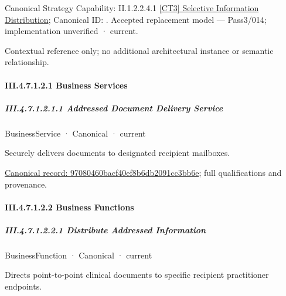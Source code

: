 {\small Canonical Strategy Capability: II.1.2.2.4.1 \hyperref[element:87869a1eec5f4c7cb87600a06cc8fd6e]{[CT3] Selective Information Distribution}; Canonical ID: \texttt{}. Accepted replacement model — Pass3/014; implementation unverified · current.}\par
Contextual reference only; no additional architectural instance or semantic relationship.\par
\paragraph*{III.4.7.1.2.1 Business Services}
\label{navigation:III.4.7.1.2.1}

\subparagraph*{III.4.7.1.2.1.1 Addressed Document Delivery Service}
\label{navigation:III.4.7.1.2.1.1}

\label{element:97080460bacf40ef8b6db2091cc3bb6e}
{\small BusinessService · Canonical · current}\par

Securely delivers documents to designated recipient mailboxes.


{\footnotesize \href{../../../../continuum/business/business-service/97080460bacf40ef8b6db2091cc3bb6e.md}{Canonical record: 97080460bacf40ef8b6db2091cc3bb6e}; full qualifications and provenance.}\par
\paragraph*{III.4.7.1.2.2 Business Functions}
\label{navigation:III.4.7.1.2.2}

\subparagraph*{III.4.7.1.2.2.1 Distribute Addressed Information}
\label{navigation:III.4.7.1.2.2.1}

\label{element:6c9090a3d0a74a968475e05eb617e84f}
{\small BusinessFunction · Canonical · current}\par

Directs point-to-point clinical documents to specific recipient practitioner endpoints.


